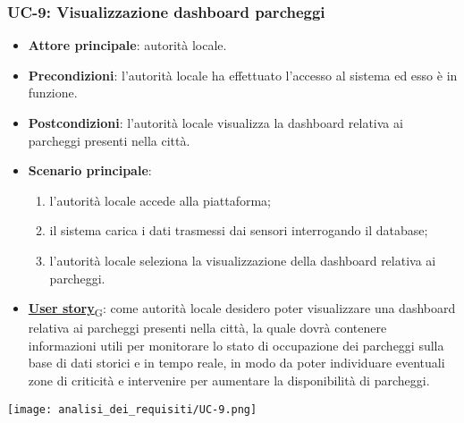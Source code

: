 \subsubsection{UC-9: Visualizzazione dashboard parcheggi}
\begin{itemize}
	\item \textbf{Attore principale}: autorità locale.
	\item \textbf{Precondizioni}: l'autorità locale ha effettuato l'accesso al sistema ed esso è in funzione.
	\item \textbf{Postcondizioni}: l'autorità locale visualizza la dashboard relativa
	      ai parcheggi presenti nella città.
	\item \textbf{Scenario principale}:
	      \begin{enumerate}
		      \item l'autorità locale accede alla piattaforma;
		      \item il sistema carica i dati trasmessi dai sensori interrogando il database;
		      \item l'autorità locale seleziona la visualizzazione della dashboard relativa ai parcheggi.
	      \end{enumerate}
	\item \href{https://7last.github.io/docs/rtb/documentazione-interna/glossario\#user-story}{\textbf{User story}\textsubscript{G}}:
	      come autorità locale desidero poter visualizzare una dashboard relativa ai parcheggi presenti nella città, la quale
	      dovrà contenere informazioni utili per monitorare lo stato di occupazione dei parcheggi sulla base di dati storici e in tempo reale,
	      in modo da poter individuare eventuali zone di criticità e intervenire per aumentare la disponibilità di parcheggi.
\end{itemize}
\begin{center}
	\texttt{[image: analisi\_dei\_requisiti/UC-9.png]}
\end{center}


